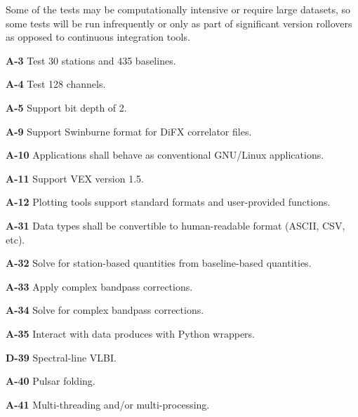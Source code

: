 Some of the tests may be computationally intensive or require large datasets, so some tests will be run infrequently or only as part of significant version rollovers 
as opposed to continuous integration tools.

\begin{description}

\item{\textbf{A-3}} Test 30 stations and 435 baselines.
\item{\textbf{A-4}} Test 128 channels.
\item{\textbf{A-5}} Support bit depth of 2.

\item{\textbf{A-9}} Support Swinburne format for DiFX correlator files.
\item{\textbf{A-10}} Applications shall behave as conventional GNU/Linux applications.
\item{\textbf{A-11}} Support VEX version 1.5.
\item{\textbf{A-12}} Plotting tools support standard formats and user-provided functions.

\item{\textbf{A-31}} Data types shall be convertible to human-readable format (ASCII, CSV, etc).
\item{\textbf{A-32}} Solve for station-based quantities from baseline-based quantities.
\item{\textbf{A-33}} Apply complex bandpass corrections.
\item{\textbf{A-34}} Solve for complex bandpass corrections.
\item{\textbf{A-35}} Interact with data produces with Python wrappers.

\item{\textbf{D-39}} Spectral-line VLBI.
\item{\textbf{A-40}} Pulsar folding.
\item{\textbf{A-41}} Multi-threading and/or multi-processing.

\end{description}


